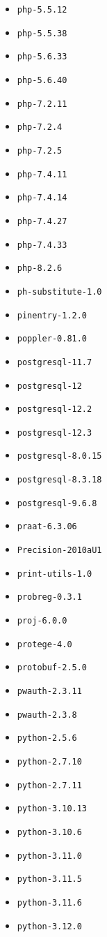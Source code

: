 \begin{multicols}{3}
\begin{itemize}
\item \verb|php-5.5.12|
\item \verb|php-5.5.38|
\item \verb|php-5.6.33|
\item \verb|php-5.6.40|
\item \verb|php-7.2.11|
\item \verb|php-7.2.4|
\item \verb|php-7.2.5|
\item \verb|php-7.4.11|
\item \verb|php-7.4.14|
\item \verb|php-7.4.27|
\item \verb|php-7.4.33|
\item \verb|php-8.2.6|
\item \verb|ph-substitute-1.0|
\item \verb|pinentry-1.2.0|
\item \verb|poppler-0.81.0|
\item \verb|postgresql-11.7|
\item \verb|postgresql-12|
\item \verb|postgresql-12.2|
\item \verb|postgresql-12.3|
\item \verb|postgresql-8.0.15|
\item \verb|postgresql-8.3.18|
\item \verb|postgresql-9.6.8|
\item \verb|praat-6.3.06|
\item \verb|Precision-2010aU1|
\item \verb|print-utils-1.0|
\item \verb|probreg-0.3.1|
\item \verb|proj-6.0.0|
\item \verb|protege-4.0|
\item \verb|protobuf-2.5.0|
\item \verb|pwauth-2.3.11|
\item \verb|pwauth-2.3.8|
\item \verb|python-2.5.6|
\item \verb|python-2.7.10|
\item \verb|python-2.7.11|
\item \verb|python-3.10.13|
\item \verb|python-3.10.6|
\item \verb|python-3.11.0|
\item \verb|python-3.11.5|
\item \verb|python-3.11.6|
\item \verb|python-3.12.0|

\end{itemize}
\end{multicols}
